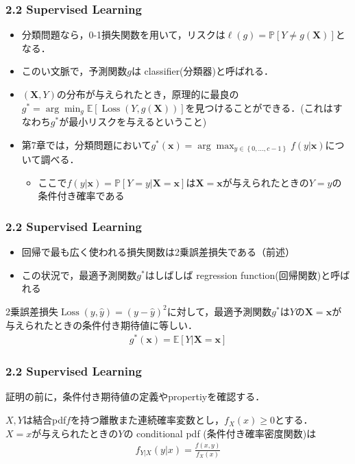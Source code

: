 \documentclass[dvipdfmx,cjk]{beamer}
\theoremstyle{example}
\DeclareMathOperator{\Loss}{Loss}
\begin{document}
\begin{frame}
    \frametitle{2.2 Supervised Learning}
    \begin{itemize}
        \item 分類問題なら，0-1損失関数を用いて，リスクは$\ell(g) = \mathbb{P}[Y\neq g(\boldsymbol{X})]$となる．
        \item このい文脈で，予測関数$g$は classifier(分類器)と呼ばれる．
        \item $(\boldsymbol{X},Y)$の分布が与えられたとき，原理的に最良の$g^*=\arg\min_g \mathbb{E}[\Loss (Y,g(\boldsymbol{X}))]$を見つけることができる．(これはすなわち$g^*$が最小リスクを与えるということ)
        \item 第7章では，分類問題において$g^*(\boldsymbol{x})=\arg\max _{y\in\left\{0,\dots,c-1\right\}} f(y|\boldsymbol{x})$について調べる．
              \begin{itemize}
                  \item ここで$f(y|\boldsymbol{x})=\mathbb{P}[Y=y|\boldsymbol{X}=\boldsymbol{x}]$は$\boldsymbol{X}=\boldsymbol{x}$が与えられたときの$Y=y$の条件付き確率である
              \end{itemize}
    \end{itemize}
\end{frame}

\begin{frame}
    \frametitle{2.2 Supervised Learning}
    \begin{itemize}
        \item 回帰で最も広く使われる損失関数は2乗誤差損失である（前述）
        \item この状況で，最適予測関数$g^*$はしばしば regression function(回帰関数)と呼ばれる
    \end{itemize}
    \begin{theorem}
        2乗誤差損失$\Loss (y,\hat{y})=(y-\hat{y})^2$に対して，最適予測関数$g^*$は$Y$の$\boldsymbol{X}=\boldsymbol{x}$が与えられたときの条件付き期待値に等しい．
        \begin{align*}
            g^*(\boldsymbol{x}) = \mathbb{E}[Y|\boldsymbol{X}=\boldsymbol{x}]
        \end{align*}
    \end{theorem}
\end{frame}

\begin{frame}
    \frametitle{2.2 Supervised Learning}
    証明の前に，条件付き期待値の定義やpropertiyを確認する．
    \begin{definition}
        $X,Y$は結合pdf$f$を持つ離散また連続確率変数とし，$f_X(x)\geq0$とする．\\
        $X=x$が与えられたときの$Y$の conditional pdf (条件付き確率密度関数)は
        \begin{align*}
            f_{Y|X}(y|x) = \frac{f(x,y)}{f_X(x)}
        \end{align*}
    \end{definition}
\end{frame}
\end{document}
